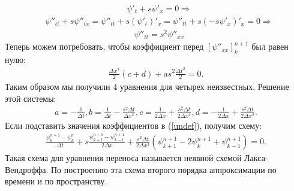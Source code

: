 \documentclass[12pt]{article}
\newcommand{\dt}{\Delta t}
\newcommand{\dx}{\Delta x}
\begin{document}
\begin{align}
	&\psi'_t+s\psi'_x = 0 \Rightarrow
\end{align}
	\begin{align}
	&\psi''_{tt}+s\psi''_{tx}=\psi''_{tt}+s(\psi'_{t})'_x=\psi''_{tt}+s(-s\psi'_x)'_x=0 \Rightarrow
\end{align}
\begin{align}
&\psi''_{tt}=s^2\psi''_{xx}
\end{align}
Теперь можем потребовать, чтобы коэффициент перед $[\psi''_{xx}]^{n+1}_k$ был равен нулю:
\begin{align}
	\frac{\dx^2}{2}(c+d)+as^2\frac{\dt^2}{2}=0.
\end{align}
Таким образом мы получили 4 уравнения для четырех неизвестных. Решение этой системы:
\begin{align}
	a=-\frac{1}{\dt}, b=\frac{1}{\dt}-\frac{s^2\dt}{\dx^2}, c=\frac{1}{2\dx}+\frac{s^2\dt}{2\dx^2}, d=-\frac{1}{2\dx}+\frac{s^2\dt}{2\dx^2}. 
\end{align}
Если подставить значения коэффициентов в (\ref{undef}), получим схему:
\begin{align}
	\frac{\psi_{k}^{n+1}-\psi_{k}^{n}}{\dt} + s \frac{\psi_{k+1}^{n+1}-\psi_{k-1}^{n+1}}{2\dx}+\frac{s^2\dt}{2\dx^2}(\psi_{k+1}^{n+1}-2\psi_{k}^{n+1}+\psi_{k-1}^{n+1})=0.
\end{align}
Такая схема для уравнения переноса называется неявной схемой Лакса-Вендроффа. По построению эта схема второго порядка аппроксимации по времени и по пространству. 
\end{document}
